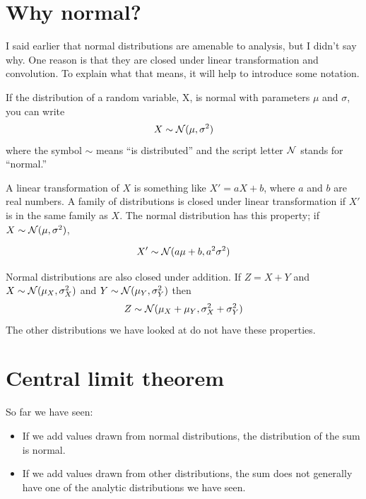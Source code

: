 \documentclass[12pt]{book}
\begin{document}
\section{Why normal?}
\label{why_normal}

I said earlier that normal distributions are amenable to analysis,
but I didn't say why.  One reason is that they are
closed under linear transformation and convolution.  To explain what
that means, it will help to introduce some notation.

If the distribution of a random variable, X, is
normal with parameters $\mu$ and $\sigma$, you can write
%
\[ X \sim \mathcal{N} (\mu, \sigma^{2})\]
%
where the symbol $\sim$ means ``is distributed'' and the script letter
$\mathcal{N}$ stands for ``normal.''


A linear transformation of $X$ is something like $X' = a X + b$, where
$a$ and $b$ are real numbers.
A family of distributions is closed under
linear transformation if $X'$ is in the same family as $X$.  The normal
distribution has this property; if $X \sim \mathcal{N} (\mu,
\sigma^2)$,

\[ X' \sim \mathcal{N} (a \mu + b, a^{2} \sigma^2)\]

Normal distributions are also closed under addition.  
If $Z = X + Y$ and
$X \sim \mathcal{N} (\mu_{X}, \sigma_{X}^{2})$ and
$Y \sim \mathcal{N} (\mu_{Y}, \sigma_{Y}^{2})$ then
%
\[ Z \sim \mathcal{N} (\mu_X + \mu_Y, \sigma_X^2 + \sigma_Y^2) \]
%
The other distributions we have looked at do not have these
properties.



\section{Central limit theorem}
\label{CLT}

So far we have seen:

\begin{itemize}

\item If we add values drawn from normal distributions, the distribution
of the sum is normal.

\item If we add values drawn from other distributions, the sum does not
generally have one of the analytic distributions we have seen.

\end{itemize}
\end{document}
